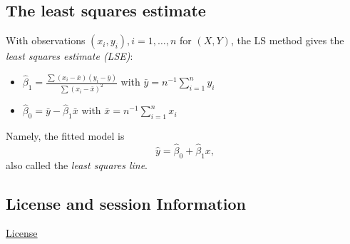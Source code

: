 \documentclass[]{article}
\begin{document}
\subsection{The least squares
estimate}\label{the-least-squares-estimate}

With observations \((x_i,y_i),i=1,\ldots,n\) for \((X,Y)\), the LS
method gives the \emph{least squares estimate (LSE)}:

\begin{itemize}
\item
  \(\hat{\beta}_1 = \frac{\sum (x_i - \bar{x})(y_i - \bar{y})}{\sum (x_i - \bar{x})^2}\)
  with \(\bar{y}=n^{-1}\sum_{i=1}^n y_i\)
\item
  \(\hat{\beta}_0 = \bar{y} - \hat{\beta}_1 \bar{x}\) with
  \(\bar{x}=n^{-1}\sum_{i=1}^n x_i\)
\end{itemize}

Namely, the fitted model is
\[\hat{y} = \hat{\beta}_0 + \hat{\beta}_1 x,\] also called the
\emph{least squares line}.

\subsection{License and session
Information}\label{license-and-session-information}

\href{http://math.wsu.edu/faculty/xchen/stat412/LICENSE.html}{License}
\end{document}
